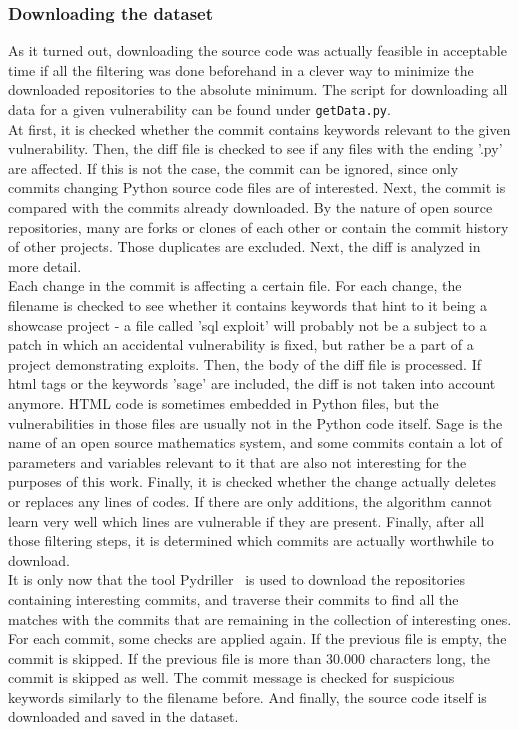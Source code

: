 \documentclass[
a4paper,
pagesize,
pdftex,
12pt,
ngerman,
fleqn,
final,
]{scrartcl}
\begin{document}
	\subsubsection{Downloading the dataset}
	As it turned out, downloading the source code was actually feasible in acceptable time if all the filtering was done beforehand in a clever way to minimize the downloaded repositories to the absolute minimum. The script for downloading all data for a given vulnerability can be found under \texttt{getData.py}.\\
	At first, it is checked whether the commit contains keywords relevant to the given vulnerability. Then, the diff file is checked to see if any files with the ending '.py' are affected. If this is not the case, the commit can be ignored, since only commits changing Python source code files are of interested. Next, the commit is compared with the commits already downloaded. By the nature of open source repositories, many are forks or clones of each other or contain the commit history of other projects. Those duplicates are excluded. Next, the diff is analyzed in more detail.\\
	Each change in the commit is affecting a certain file. For each change, the filename is checked to see whether it contains keywords that hint to it being a showcase project - a file called 'sql exploit' will probably not be a subject to a patch in which an accidental vulnerability is fixed, but rather be a part of a project demonstrating exploits. Then, the body of the diff file is processed. If html tags or the keywords 'sage' are included, the diff is not taken into account anymore. HTML code is sometimes embedded in Python files, but the vulnerabilities in those files are usually not in the Python code itself. Sage is the name of an open source mathematics system, and some commits contain a lot of parameters and variables relevant to it that are also not interesting for the purposes of this work. Finally, it is checked whether the change actually deletes or replaces any lines of codes. If there are only additions, the algorithm cannot learn very well which lines are vulnerable if they are present. Finally, after all those filtering steps, it is determined which commits are actually worthwhile to download.\\
	It is only now that the tool Pydriller~\cite{Spadini.2018} is used to download the repositories containing interesting commits, and traverse their commits to find all the matches with the commits that are remaining in the collection of interesting ones. For each commit, some checks are applied again. If the previous file is empty, the commit is skipped. If the previous file is more than 30.000 characters long, the commit is skipped as well. The commit message is checked for suspicious keywords similarly to the filename before. And finally, the source code itself is downloaded and saved in the dataset. 
	
\end{document}
